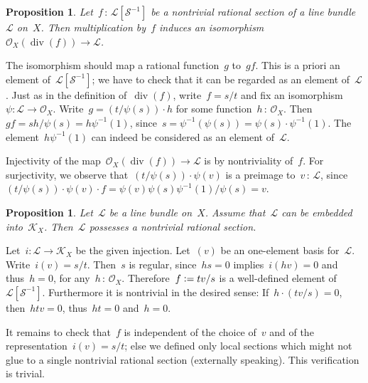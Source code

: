 \documentclass[10pt,reqno,a4paper]{amsbook}
\makeatletter
\theoremstyle{definition}
\theoremstyle{plain}
\newtheorem{prop}[defn]{Proposition}
\theoremstyle{remark}
\renewcommand{\O}{\mathcal{O}}
\newcommand{\K}{\mathcal{K}}
\renewcommand{\L}{\mathcal{L}}
\renewcommand{\S}{\mathcal{S}}
\newcommand{\?}{\,{:}\,}
\renewcommand{\_}{\mathpunct{.}\,}
\newcommand{\defeq}{\vcentcolon=}
\renewenvironment{proof}[1][\proofname]{\par
  \pushQED{\qed}%
  \normalfont \topsep6\p@\@plus6\p@\relax
  \trivlist
  \item[\hskip\labelsep
        \itshape
    #1\@addpunct{.}]\ignorespaces
}{%
  \popQED\endtrivlist\@endpefalse
}
\makeatother
\begin{document}
\begin{prop}Let~$f\?\L[\S^{-1}]$ be a nontrivial rational section of a line
bundle~$\L$ on~$X$. Then multiplication by~$f$ induces an
isomorphism~$\O_X(\operatorname{div}(f)) \to \L$.\end{prop}
\begin{proof}The isomorphism should map a rational function~$g$ to~$g f$. This
is a priori an element of~$\L[\S^{-1}]$; we have to check that it can be
regarded as an element of~$\L$. Just as in the definition
of~$\operatorname{div}(f)$, write~$f = s/t$ and fix an isomorphism~$\psi : \L
\to \O_X$. Write~$g = (t/\psi(s)) \cdot h$ for some function~$h\?\O_X$. Then~$g
f = sh/\psi(s) = h\psi^{-1}(1)$, since~$s = \psi^{-1}(\psi(s)) = \psi(s)
\cdot \psi^{-1}(1)$. The element~$h\psi^{-1}(1)$ can indeed be considered as an
element of~$\L$.

Injectivity of the map~$\O_X(\operatorname{div}(f)) \to \L$ is by
nontriviality of~$f$. For surjectivity, we observe that~$(t/\psi(s)) \cdot \psi(v)$ is a
preimage to~$v\?\L$, since~$(t/\psi(s)) \cdot \psi(v) \cdot f = \psi(v) \psi(s)
\psi^{-1}(1) / \psi(s) = v$.
\end{proof}

\begin{prop}Let~$\L$ be a line bundle on~$X$. Assume that~$\L$ can be embedded
into~$\K_X$. Then~$\L$ possesses a nontrivial rational section.
\end{prop}
\begin{proof}Let~$i : \L \to \K_X$ be the given injection. Let~$(v)$ be an
one-element basis for~$\L$. Write~$i(v) = s/t$. Then~$s$ is regular,
since~$hs = 0$ implies~$i(hv) = 0$ and thus~$h = 0$, for any~$h\?\O_X$.
Therefore~$f \defeq tv/s$ is a well-defined element of~$\L[\S^{-1}]$.
Furthermore it is nontrivial in the desired sense: If~$h \cdot (tv/s) = 0$,
then~$htv = 0$, thus~$ht = 0$ and~$h = 0$.

It remains to check that~$f$ is independent of the choice of~$v$ and of the
representation~$i(v) = s/t$; else we defined only local sections which might not
glue to a single nontrivial rational section (externally speaking). This verification is
trivial.
\end{proof}
\end{document}
